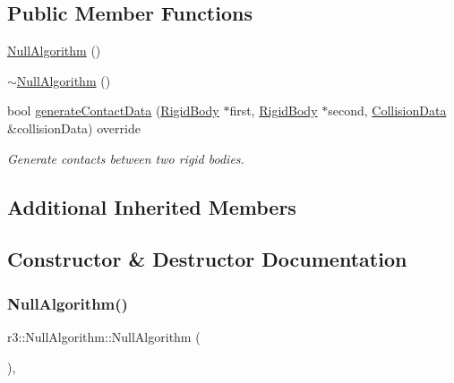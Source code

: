 \subsection*{Public Member Functions}
\begin{DoxyCompactItemize}
\item 
\mbox{\hyperlink{classr3_1_1_null_algorithm_a027b39789c2f8e1732861eaf12508ba2}{Null\+Algorithm}} ()
\item 
\mbox{\hyperlink{classr3_1_1_null_algorithm_af077d1e0ad55f18634d59b5fb2b3ed30}{$\sim$\+Null\+Algorithm}} ()
\item 
bool \mbox{\hyperlink{classr3_1_1_null_algorithm_ab7e9b0f244b44524d998497a6d47de19}{generate\+Contact\+Data}} (\mbox{\hyperlink{classr3_1_1_rigid_body}{Rigid\+Body}} $\ast$first, \mbox{\hyperlink{classr3_1_1_rigid_body}{Rigid\+Body}} $\ast$second, \mbox{\hyperlink{classr3_1_1_collision_data}{Collision\+Data}} \&collision\+Data) override
\begin{DoxyCompactList}\small\item\em Generate contacts between two rigid bodies. \end{DoxyCompactList}\end{DoxyCompactItemize}
\subsection*{Additional Inherited Members}


\subsection{Constructor \& Destructor Documentation}
\mbox{\label{classr3_1_1_null_algorithm_a027b39789c2f8e1732861eaf12508ba2}} 
\subsubsection{\texorpdfstring{Null\+Algorithm()}{NullAlgorithm()}}
{\footnotesize\ttfamily r3\+::\+Null\+Algorithm\+::\+Null\+Algorithm (\begin{DoxyParamCaption}{ }\end{DoxyParamCaption})\hspace{0.3cm}{\ttfamily [explicit]}, {\ttfamily [default]}}

